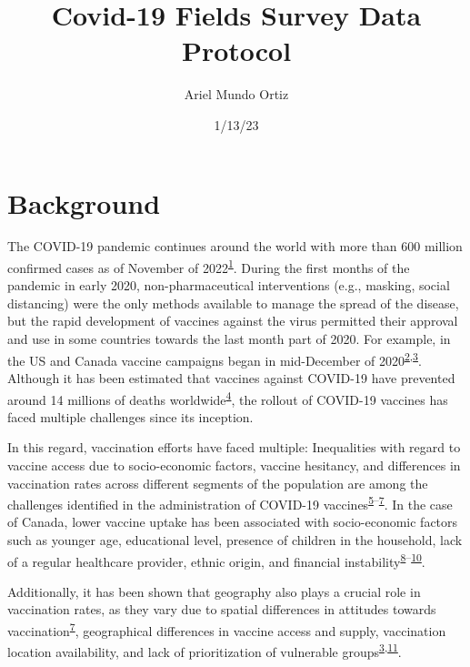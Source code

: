 \documentclass[
  letterpaper,
  DIV=11,
  numbers=noendperiod]{scrartcl}
\title{Covid-19 Fields Survey Data Protocol}
\author{Ariel Mundo Ortiz}
\date{1/13/23}
\begin{document}
\maketitle
\ifdefined\Shaded\renewenvironment{Shaded}{\begin{tcolorbox}[borderline west={3pt}{0pt}{shadecolor}, sharp corners, frame hidden, boxrule=0pt, enhanced, breakable, interior hidden]}{\end{tcolorbox}}\fi

\hypertarget{background}{%
\section{Background}\label{background}}

The COVID-19 pandemic continues around the world with more than 600
million confirmed cases as of November of
2022\textsuperscript{\protect\hyperlink{ref-WHO-Covid}{1}}. During the
first months of the pandemic in early 2020, non-pharmaceutical
interventions (e.g., masking, social distancing) were the only methods
available to manage the spread of the disease, but the rapid development
of vaccines against the virus permitted their approval and use in some
countries towards the last month part of 2020. For example, in the US
and Canada vaccine campaigns began in mid-December of
2020\textsuperscript{\protect\hyperlink{ref-tanne2020}{2},\protect\hyperlink{ref-bogoch2022}{3}}.
Although it has been estimated that vaccines against COVID-19 have
prevented around 14 millions of deaths
worldwide\textsuperscript{\protect\hyperlink{ref-watson2022}{4}}, the
rollout of COVID-19 vaccines has faced multiple challenges since its
inception.

In this regard, vaccination efforts have faced multiple: Inequalities
with regard to vaccine access due to socio-economic factors, vaccine
hesitancy, and differences in vaccination rates across different
segments of the population are among the challenges identified in the
administration of COVID-19
vaccines\textsuperscript{\protect\hyperlink{ref-gerretsen2021}{5}--\protect\hyperlink{ref-malik2020}{7}}.
In the case of Canada, lower vaccine uptake has been associated with
socio-economic factors such as younger age, educational level, presence
of children in the household, lack of a regular healthcare provider,
ethnic origin, and financial
instability\textsuperscript{\protect\hyperlink{ref-guay2022}{8}--\protect\hyperlink{ref-carter2022}{10}}.

Additionally, it has been shown that geography also plays a crucial role
in vaccination rates, as they vary due to spatial differences in
attitudes towards
vaccination\textsuperscript{\protect\hyperlink{ref-malik2020}{7}},
geographical differences in vaccine access and supply, vaccination
location availability, and lack of prioritization of vulnerable
groups\textsuperscript{\protect\hyperlink{ref-bogoch2022}{3},\protect\hyperlink{ref-nguyen2021}{11}}.
\end{document}
